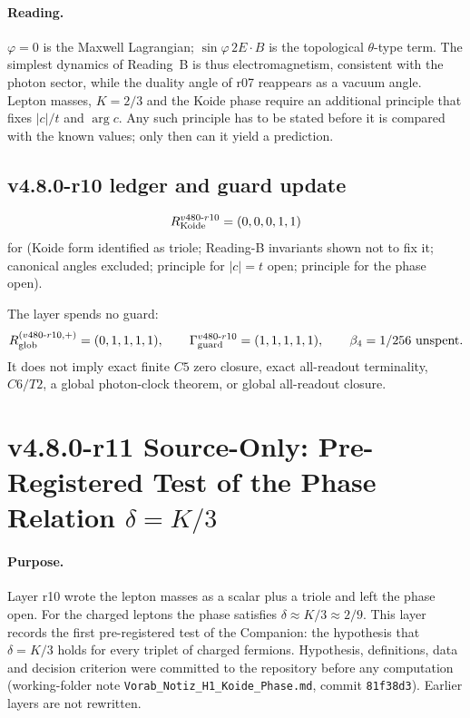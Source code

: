 \paragraph{Reading.}
\(\varphi=0\) is the Maxwell Lagrangian; \(\sin\varphi\,2E\cdot B\) is the topological \(\theta\)-type term.
The simplest dynamics of Reading~B is thus electromagnetism, consistent with the photon sector, while the
duality angle of r07 reappears as a vacuum angle.  Lepton masses, \(K=2/3\) and the Koide phase require an
additional principle that fixes \(|c|/t\) and \(\arg c\).  Any such principle has to be stated before it is
compared with the known values; only then can it yield a prediction.

\subsection*{v4.8.0-r10 ledger and guard update}
\label{subsec:v480-r10-ledger-guard}

\[
R_{\rm Koide}^{v480\text{-}r10}=(0,0,0,1,1)
\]
for (Koide form identified as triole; Reading-B invariants shown not to fix it; canonical angles excluded;
principle for \(|c|=t\) open; principle for the phase open).

The layer spends no guard:
\[
R_{\rm glob}^{(v480\text{-}r10,+)}=(0,1,1,1,1),
\qquad
\Gamma_{\rm guard}^{v480\text{-}r10}=(1,1,1,1,1),
\qquad
\beta_4=1/256\ \text{unspent}.
\]
It does not imply exact finite \(C5\) zero closure, exact all-readout terminality,
\(C6/T2\), a global photon-clock theorem, or global all-readout closure.


\clearpage
\section*{v4.8.0-r11 Source-Only: Pre-Registered Test of the Phase Relation \texorpdfstring{$\delta=K/3$}{delta = K/3}}
\label{sec:v480-r11-preregistered-h1}

\paragraph{Purpose.}
Layer r10 wrote the lepton masses as a scalar plus a triole and left the phase open.  For the charged
leptons the phase satisfies \(\delta\approx K/3\approx2/9\).  This layer records the first
pre-registered test of the Companion: the hypothesis that \(\delta=K/3\) holds for every triplet of
charged fermions.  Hypothesis, definitions, data and decision criterion were committed to the
repository before any computation (working-folder note \texttt{Vorab\_Notiz\_H1\_Koide\_Phase.md},
commit \texttt{81f38d3}).  Earlier layers are not rewritten.

